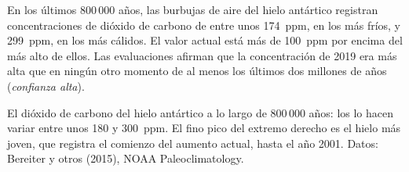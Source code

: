 \begin{proposition}\label{prop:g12:climate-change:icecore}
En los últimos 800\,000 años, las burbujas de aire del hielo antártico registran
concentraciones de dióxido de carbono de entre unos \qty{174}{ppm}, en los  más fríos, y \qty{299}{ppm}, en los  más cálidos. El valor
actual está más de \qty{100}{ppm} por encima del más alto de ellos. Las
evaluaciones afirman que la concentración de 2019 era más alta que en ningún otro momento
de al menos los últimos dos millones de años (\emph{confianza alta}).
\end{proposition}

\begin{omfigure}

{\small El dióxido de carbono del hielo antártico a lo largo de 800\,000 años: los  lo hacen variar entre unos 180 y \qty{300}{ppm}. El fino pico del
extremo derecho es el hielo más joven, que registra el comienzo del aumento
actual, hasta el año 2001. Datos: Bereiter y otros (2015), NOAA
Paleoclimatology.}
\end{omfigure}


